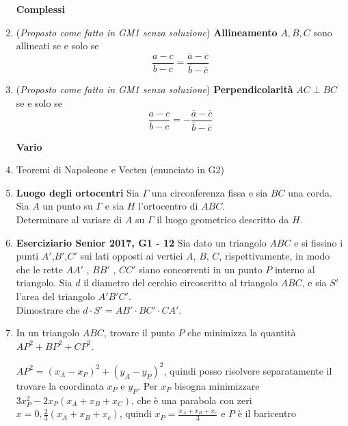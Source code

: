 \begin{enumerate}
\begin{sol}
\end{sol}





\textbf{Complessi}

\item (\emph{Proposto come fatto in GM1 senza soluzione}) \textbf{Allineamento} $A,B,C$ sono allineati se e solo se 
$$\frac{a-c}{b-c}=\frac{\overline{a}-\overline{c}}{\overline{b}-\overline{c}}$$

\item (\emph{Proposto come fatto in GM1 senza soluzione}) \textbf{Perpendicolarità} $AC\perp BC$ se e solo se 
$$\frac{a-c}{b-c}= - \frac{\overline{a}-\overline{c}}{\overline{b}-\overline{c}}$$




\textbf{Vario}

\item Teoremi di Napoleone e Vecten (enunciato in G2)

\item \textbf{Luogo degli ortocentri} Sia $\Gamma$ una circonferenza fissa e sia $BC$ una corda. Sia $A$ un punto su $\Gamma$ e sia $H$ l'ortocentro di $ABC$.\\
Determinare al variare di $A$ su $\Gamma$ il luogo geometrico descritto da $H$.

\item \textbf{Eserciziario Senior 2017, G1 - 12} Sia dato un triangolo $ABC$ e si fissino i punti $A'$,$B'$,$C'$ sui lati opposti ai vertici $A$, $B$,
$C$, rispettivamente, in modo che le rette $AA'$ , $BB'$ , $CC'$ siano concorrenti in un punto $P$ interno al triangolo. Sia $d$ il diametro del cerchio circoscritto al triangolo $ABC$, e sia $S'$ l’area del triangolo $A'B'C'$.\\
Dimostrare che $d \cdot S' = AB'\cdot BC'\cdot CA'$.

\item In un triangolo $ABC$, trovare il punto $P$ che minimizza la quantità $AP^2+BP^2+CP^2$.

\begin{sol}
 $AP^2=(x_A-x_P)^2+(y_A-y_P)^2$, quindi posso risolvere separatamente il trovare la coordinata $x_P$ e $y_P$. 
 Per $x_P$ bisogna minimizzare $3x_P^2-2x_P(x_A+x_B+x_C)$, che è una parabola con zeri $x=0, \frac{2}{3}(x_A+x_B+x_c)$, quindi $x_P=\frac{x_A+x_B+x_c}{3}$ e $P$ è il baricentro
\end{sol}



\end{enumerate}


